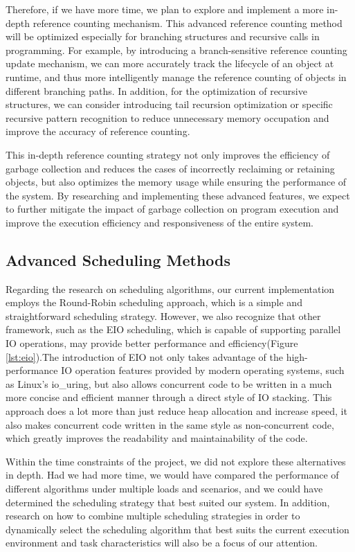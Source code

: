 \documentclass{l4proj}
\begin{document}
Therefore, if we have more time, we plan to explore and implement a more in-depth reference counting mechanism. This advanced reference counting method will be optimized especially for branching structures and recursive calls in programming. For example, by introducing a branch-sensitive reference counting update mechanism, we can more accurately track the lifecycle of an object at runtime, and thus more intelligently manage the reference counting of objects in different branching paths. In addition, for the optimization of recursive structures, we can consider introducing tail recursion optimization or specific recursive pattern recognition to reduce unnecessary memory occupation and improve the accuracy of reference counting.

This in-depth reference counting strategy not only improves the efficiency of garbage collection and reduces the cases of incorrectly reclaiming or retaining objects, but also optimizes the memory usage while ensuring the performance of the system. By researching and implementing these advanced features, we expect to further mitigate the impact of garbage collection on program execution and improve the execution efficiency and responsiveness of the entire system.

\subsection{Advanced Scheduling Methods}

Regarding the research on scheduling algorithms, our current implementation employs the Round-Robin scheduling approach, which is a simple and straightforward scheduling strategy. However, we also recognize that other framework, such as the EIO scheduling, which is capable of supporting parallel IO operations, may provide better performance and efficiency(Figure \ref{lst:eio}).The introduction of EIO not only takes advantage of the high-performance IO operation features provided by modern operating systems, such as Linux's io\_uring, but also allows concurrent code to be written in a much more concise and efficient manner through a direct style of IO stacking. This approach does a lot more than just reduce heap allocation and increase speed, it also makes concurrent code written in the same style as non-concurrent code, which greatly improves the readability and maintainability of the code.

Within the time constraints of the project, we did not explore these alternatives in depth. Had we had more time, we would have compared the performance of different algorithms under multiple loads and scenarios, and we could have determined the scheduling strategy that best suited our system. In addition, research on how to combine multiple scheduling strategies in order to dynamically select the scheduling algorithm that best suits the current execution environment and task characteristics will also be a focus of our attention.
\end{document}
